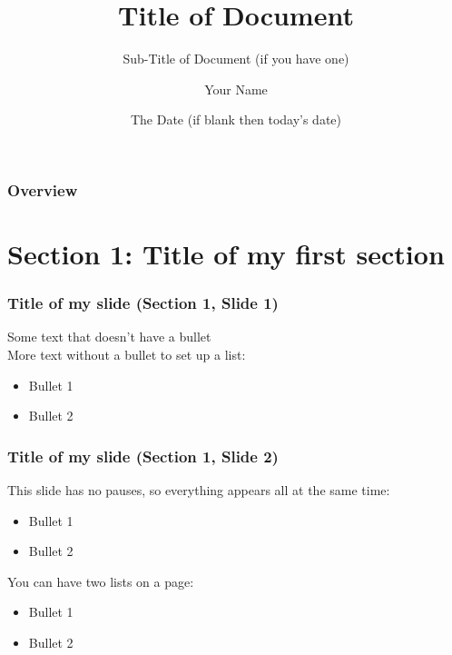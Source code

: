 \documentclass{beamer}    %
\title{Title of Document}
\subtitle{Sub-Title of Document (if you have one)}
\author{Your Name}
\date{The Date (if blank then today's date)}
\begin{document}
\frame{\titlepage}          %

\begin{frame}               %
\frametitle{Overview}       %
\tableofcontents            %
\end{frame}                 %

\section{Section 1: Title of my first section} %
\begin{frame}
\frametitle{Title of my slide (Section 1, Slide 1)}
\pause            %
Some text that doesn't have a bullet\\
\bigskip
\pause
More text without a bullet to set up a list:
\begin{itemize}              %
\pause
\item Bullet 1
\pause
\item Bullet 2
\end{itemize}
\end{frame}

\begin{frame}
\frametitle{Title of my slide (Section 1, Slide 2)}
This slide has no pauses, so everything appears all at the same time:
\begin{itemize}
\item Bullet 1
\item Bullet 2
\end{itemize}
\bigskip
You can have two lists on a page:
\begin{itemize}
\item Bullet 1
\item Bullet 2
\end{itemize}
\end{frame}
\end{document}
